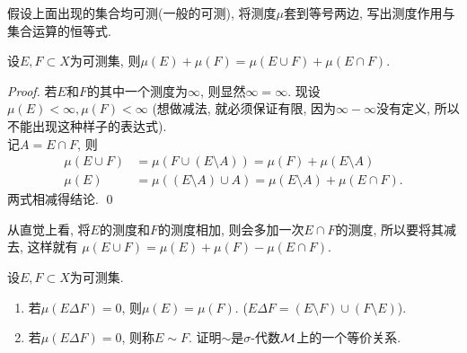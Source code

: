 \begin{exercise}
    假设上面出现的集合均可测(一般的可测), 将测度$\mu$套到等号两边, 写出测度作用与集合运算的恒等式. 
\end{exercise}
\begin{exercise}\label{inclu-exclu-basic-case}
    设$E,F \subset X$为可测集, 则$\mu(E)+\mu(F) = \mu(E \cup F) + \mu(E \cap F)$.
\end{exercise}
\begin{proof}
    若$E$和$F$的其中一个测度为$\infty$, 则显然$\infty = \infty$. 现设$\mu(E)<\infty, \mu(F)<\infty$ (想做减法, 就必须保证有限, 因为$\infty - \infty$没有定义, 所以不能出现这种样子的表达式). \\
    记$A = E \cap F$, 则
    \begin{align*}
    \mu(E \cup F)
    &= \mu(F \cup (E \setminus A)) = \mu(F) + \mu(E \setminus A) \\
    \mu(E) &= \mu((E \setminus A) \cup A)
    = \mu(E \setminus A) + \mu(E \cap F). 
    \end{align*}
    两式相减得结论. \qed 
\end{proof}
\begin{remark}
    从直觉上看, 将$E$的测度和$F$的测度相加, 则会多加一次$E \cap F$的测度, 所以要将其减去, 这样就有
    $\mu(E \cup F) = \mu(E) + \mu(F) - \mu(E \cap F)$. 
\end{remark}
\begin{example}
    设$E,F \subset X$为可测集. 
    \begin{enumerate}
    \item 若$\mu(E \Delta F) = 0$, 则$\mu(E)=\mu(F)$. ($E \Delta F = (E \setminus F) \cup (F \setminus E)$).
    \item 若$\mu(E \Delta F) = 0$, 则称$E \sim F$. 证明$\sim$是$\sigma$-代数$\mathcal{M}$上的一个等价关系. 
    \end{enumerate}
\end{example}
